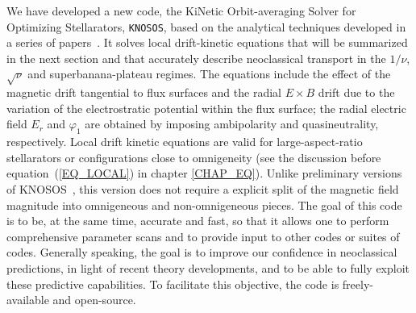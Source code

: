We have developed a new code, the KiNetic Orbit-averaging Solver for Optimizing Stellarators, \texttt{KNOSOS}, based on the analytical techniques developed in a series of papers~\citep{calvo2013er,calvo2014er,calvo2015flowdamping,calvo2017sqrtnu,calvo2018jpp}. It solves local drift-kinetic equations that will be summarized in the next section and that accurately describe neoclassical transport in the $1/\nu$, $\sqrt{\nu}$ and superbanana-plateau regimes. The equations include the effect of the magnetic drift tangential to flux surfaces and the radial $E\!\times\!B$ drift due to the variation of the electrostratic potential within the flux surface; the radial electric field $E_r$ and $\varphi_1$ are obtained by imposing ambipolarity and quasineutrality, respectively. Local drift kinetic equations are valid for large-aspect-ratio stellarators or configurations close to omnigeneity (see the discussion before equation~(\ref{EQ_LOCAL}) in chapter \ref{CHAP_EQ}). Unlike preliminary versions of {\ttfamily KNOSOS}~\citep{velasco2018phi1,calvo2018jpp}, this version does not require a explicit split of the magnetic field magnitude into omnigeneous and non-omnigeneous pieces. The goal of this code is to be, at the same time, accurate and fast, so that it allows one to perform comprehensive parameter scans and to provide input to other codes or suites of codes. Generally speaking, the goal is to improve our confidence in neoclassical predictions, in light of recent theory developments, and to be able to fully exploit these predictive capabilities. To facilitate this objective, the code is freely-available and open-source.%

